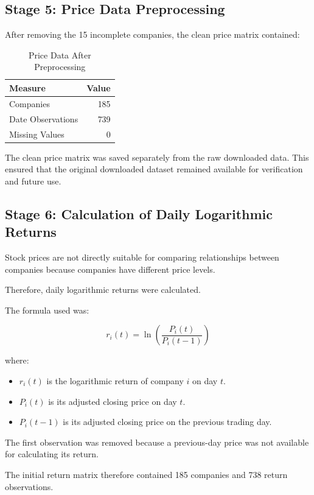 \documentclass[11pt,a4paper]{article}
\begin{document}
\subsection{Stage 5: Price Data Preprocessing}

After removing the 15 incomplete companies, the clean
price matrix contained:

\begin{table}[H]
\centering
\caption{Price Data After Preprocessing}
\label{tab:clean_prices}
\begin{tabular}{lr}
\toprule
\textbf{Measure} & \textbf{Value}\\
\midrule
Companies & 185\\
Date Observations & 739\\
Missing Values & 0\\
\bottomrule
\end{tabular}
\end{table}

The clean price matrix was saved separately from the raw
downloaded data. This ensured that the original downloaded
dataset remained available for verification and future use.

\subsection{Stage 6: Calculation of Daily Logarithmic Returns}

Stock prices are not directly suitable for comparing
relationships between companies because companies have
different price levels.

Therefore, daily logarithmic returns were calculated.

The formula used was:

\[
r_i(t)=\ln\left(\frac{P_i(t)}{P_i(t-1)}\right)
\]

where:

\begin{itemize}
    \item $r_i(t)$ is the logarithmic return of company $i$
    on day $t$.
    \item $P_i(t)$ is its adjusted closing price on day $t$.
    \item $P_i(t-1)$ is its adjusted closing price on the
    previous trading day.
\end{itemize}

The first observation was removed because a previous-day
price was not available for calculating its return.

The initial return matrix therefore contained 185 companies
and 738 return observations.
\end{document}
